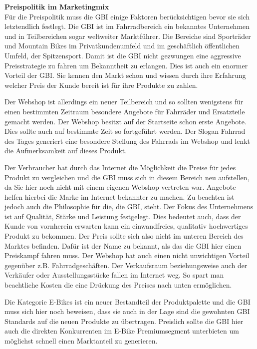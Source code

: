 \small{\textbf{Preispolitik im Marketingmix}}\\
Für die Preispolitik muss die GBI einige Faktoren berücksichtigen bevor sie sich letztendlich festlegt. Die GBI ist im Fahrradbereich ein bekanntes Unternehmen und in Teilbereichen sogar weltweiter Marktführer. Die Bereiche sind Sporträder und Mountain Bikes im Privatkundenumfeld und im geschäftlich öffentlichen Umfeld, der Spitzensport. Damit ist die GBI nicht gezwungen eine aggressive Preisstrategie zu fahren um Bekanntheit zu erlangen. Dies ist auch ein enormer Vorteil der GBI. Sie kennen den Markt schon und wissen durch ihre Erfahrung welcher Preis der Kunde bereit ist für ihre Produkte zu zahlen.

Der Webshop ist allerdings ein neuer Teilbereich und so sollten wenigstens für einen bestimmten Zeitraum besondere Angebote für Fahrräder und Ersatzteile gemacht werden. Der Webshop besitzt auf der Startseite schon erste Angebote. Dies sollte auch auf bestimmte Zeit so fortgeführt werden. Der Slogan \glqq Fahrrad des Tages\grqq{} generiert eine besondere Stellung des Fahrrads im Webshop und lenkt die Aufmerksamkeit auf dieses Produkt.

Der Verbraucher hat durch das Internet die Möglichkeit die Preise für jedes Produkt zu vergleichen und die GBI muss sich in diesem Bereich neu aufstellen, da Sie hier noch nicht mit einem eigenen Webshop vertreten war. Angebote helfen hierbei die Marke im Internet bekannter zu machen. Zu beachten ist jedoch auch die Philosophie für die, die GBI, steht. Der Fokus des Unternehmens ist auf Qualität, Stärke und Leistung festgelegt. Dies bedeutet auch, dass der Kunde von vornherein erwarten kann ein einwandfreies, qualitativ hochwertiges Produkt zu bekommen. Der Preis sollte sich also nicht im unteren Bereich des Marktes befinden. Dafür ist der Name zu bekannt, als das die GBI hier einen Preiskampf fahren muss. Der Webshop hat auch einen nicht unwichtigen Vorteil gegenüber z.B. Fahrradgeschäften. Der Verkaufsraum beziehungsweise auch der Verkäufer oder Ausstellungsstücke fallen im Internet weg. So spart man beachtliche Kosten die eine Drückung des Preises nach unten ermöglichen.

Die Kategorie E-Bikes ist ein neuer Bestandteil der Produktpalette und die GBI muss sich hier noch beweisen, dass sie auch in der Lage sind die gewohnten GBI Standards auf die neuen Produkte zu übertragen. Preislich sollte die GBI hier auch die direkten Konkurrenten im E-Bike Premiumsegment unterbieten um möglichst schnell einen Marktanteil zu generieren.


